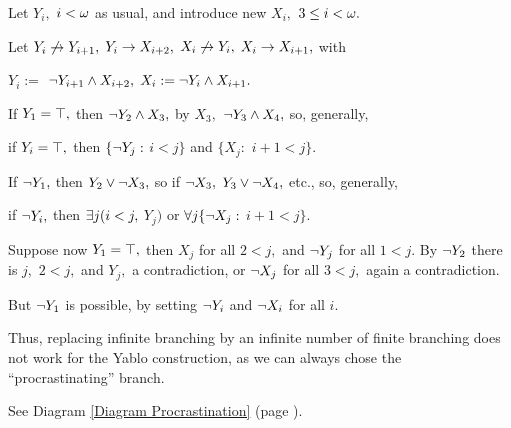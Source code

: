 Let $Y_{i},$ $i< \omega $ as usual, and introduce new $X_{i},$ $3 \leq i<
\omega.$

Let $Y_{i} \not\rightarrow Y_{i+1},$ $Y_{i} \rightarrow X_{i+2},$ $X_{i} \not\rightarrow Y_{i},$ $X_{i}
\rightarrow X_{i+1},$ with

$Y_{i}:=$ $ \neg Y_{i+1} \wedge X_{i+2},$ $X_{i}:= \neg Y_{i} \wedge X_{i+1}.$

If $Y_{1}= \top,$ then $ \neg Y_{2} \wedge X_{3},$ by $X_{3},$ $ \neg Y_{3}
\wedge X_{4},$ so, generally,

if $Y_{i}= \top,$ then $\{ \neg Y_{j}:$ $i<j\}$ and $\{X_{j}:$ $i+1<j\}.$

If $ \neg Y_{1},$ then $Y_{2} \vee \neg X_{3},$ so if $ \neg X_{3},$
$Y_{3} \vee \neg X_{4},$ etc., so, generally,

if $ \neg Y_{i},$ then $ \exists j(i<j,$ $Y_{j})$ or $ \forall j\{ \neg X_{j}:$
$i+1<j\}.$

Suppose now $Y_{1}= \top,$ then $X_{j}$ for all $2<j,$ and $ \neg Y_{j}$
for all $1<j.$
By $ \neg Y_{2}$ there is $j,$ $2<j,$ and $Y_{j},$ a contradiction, or $
\neg X_{j}$ for all $3<j,$
again a contradiction.

But $ \neg Y_{1}$ is possible, by setting $ \neg Y_{i}$ and $ \neg X_{i}$
for all $i.$

Thus, replacing infinite branching by an infinite number of finite
branching does not work for the Yablo construction, as we can always chose
the
``procrastinating'' branch.

See Diagram 
\ref{Diagram Procrastination} (page 
\pageref{Diagram Procrastination}).

\clearpage



